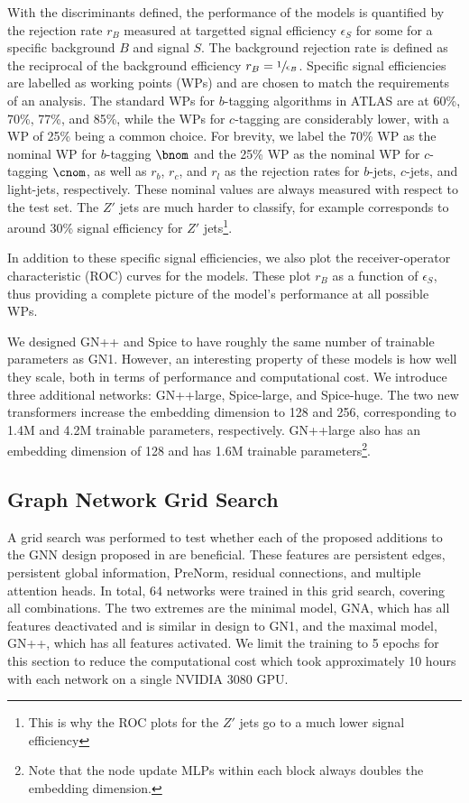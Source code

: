 With the discriminants defined, the performance of the models is quantified by the rejection rate $r_B$ measured at targetted signal efficiency $\epsilon_S$ for some for a specific background $B$ and signal $S$.
The background rejection rate is defined as the reciprocal of the background efficiency $r_B = \sfrac{1}{\epsilon_B}$.
Specific signal efficiencies are labelled as working points (WPs) and are chosen to match the requirements of an analysis.
The standard WPs for $b$-tagging algorithms in ATLAS are at 60\%, 70\%, 77\%, and 85\%, while the WPs for $c$-tagging are considerably lower, with a WP of 25\% being a common choice.
For brevity, we label the 70\% WP as the nominal WP for $b$-tagging $\bnom$ and the 25\% WP as the nominal WP for $c$-tagging $\cnom$, as well as $r_b$, $r_c$, and $r_l$ as the rejection rates for $b$-jets, $c$-jets, and light-jets, respectively.
These nominal values are always measured with respect to the \ttbar test set.
The $Z'$ jets are much harder to classify, for example \bnom corresponds to around 30\% signal efficiency for $Z'$ jets\footnote{This is why the ROC plots for the $Z'$ jets go to a much lower signal efficiency}.

In addition to these specific signal efficiencies, we also plot the receiver-operator characteristic (ROC) curves for the models.
These plot $r_B$ as a function of $\epsilon_S$, thus providing a complete picture of the model's performance at all possible WPs.

We designed GN++ and Spice to have roughly the same number of trainable parameters as GN1.
However, an interesting property of these models is how well they scale, both in terms of performance and computational cost.
We introduce three additional networks: GN++large, Spice-large, and Spice-huge.
The two new transformers increase the embedding dimension to 128 and 256, corresponding to 1.4M and 4.2M trainable parameters, respectively.
GN++large also has an embedding dimension of 128 and has 1.6M trainable parameters\footnote{Note that the node update MLPs within each block always doubles the embedding dimension.}.

\subsection{Graph Network Grid Search}

A grid search was performed to test whether each of the proposed additions to the GNN design proposed in  are beneficial.
These features are persistent edges, persistent global information, PreNorm, residual connections, and multiple attention heads.
In total, 64 networks were trained in this grid search, covering all combinations.
The two extremes are the minimal model, GNA, which has all features deactivated and is similar in design to GN1, and the maximal model, GN++, which has all features activated.
We limit the training to 5 epochs for this section to reduce the computational cost which took approximately 10 hours with each network on a single NVIDIA 3080 GPU\@.

